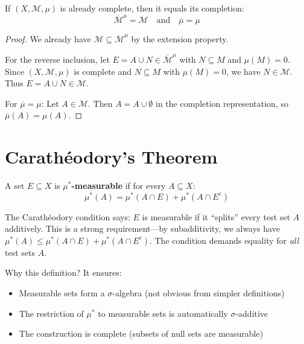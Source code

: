 \begin{corollary}
    If $(X, \mathcal{M}, \mu)$ is already complete, then it equals its completion:
    \[
        \overline{\mathcal{M}}^\mu = \mathcal{M} \quad \text{and} \quad \overline{\mu} = \mu
    \]
\end{corollary}

\begin{proof}
    We already have $\mathcal{M} \subseteq \overline{\mathcal{M}}^\mu$ by the extension property.
    
    For the reverse inclusion, let $E = A \cup N \in \overline{\mathcal{M}}^\mu$ with $N \subseteq M$ 
    and $\mu(M) = 0$. Since $(X, \mathcal{M}, \mu)$ is complete and $N \subseteq M$ with $\mu(M) = 0$, 
    we have $N \in \mathcal{M}$. Thus $E = A \cup N \in \mathcal{M}$.
    
    For $\overline{\mu} = \mu$: Let $A \in \mathcal{M}$. Then $A = A \cup \emptyset$ in the completion 
    representation, so $\overline{\mu}(A) = \mu(A)$.
\end{proof}



\section{Carathéodory's Theorem}

\begin{definition}
A set $E \subseteq X$ is \textbf{$\mu^*$-measurable} if for every $A \subseteq X$:
\[ \mu^*(A) = \mu^*(A \cap E) + \mu^*(A \cap E^c) \]
\end{definition}

\begin{intuition}
The Carathéodory condition says: $E$ is measurable if it ``splits'' every test set $A$ additively. This is a strong requirement---by subadditivity, we always have $\mu^*(A) \leq \mu^*(A \cap E) + \mu^*(A \cap E^c)$. The condition demands equality for \emph{all} test sets $A$.

Why this definition? It ensures:
\begin{itemize}
    \item Measurable sets form a $\sigma$-algebra (not obvious from simpler definitions)
    \item The restriction of $\mu^*$ to measurable sets is automatically $\sigma$-additive
    \item The construction is complete (subsets of null sets are measurable)
\end{itemize}
\end{intuition}

